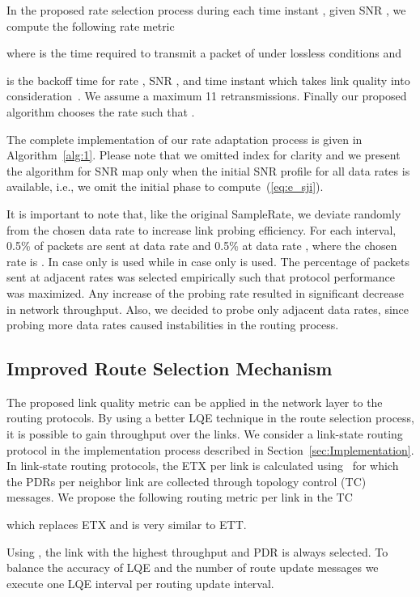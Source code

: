 \documentclass[11pt,draftclsnofoot,journal,onecolumn]{IEEEtran}
\begin{document}
In the proposed rate selection process during each time instant , given SNR , we compute the following rate metric

where  is the time required to transmit a packet of  under lossless conditions and

is the backoff time for rate , SNR , and time instant  which takes link quality into consideration~\cite[Eq. 17]{Draves_MobiCom_2004}. We assume a maximum 11 retransmissions. Finally our proposed algorithm chooses the rate such that .


The complete implementation of our rate adaptation process is given in Algorithm~\ref{alg:1}. Please note that we omitted index  for clarity and we present the algorithm for SNR map only when the initial SNR profile for all data rates is available, i.e., we omit the initial phase to compute~(\ref{eq:e_sji}).

It is important to note that, like the original SampleRate, we deviate randomly from the chosen data rate to increase link probing efficiency. For each interval, 0.5\% of packets are sent at data rate  and 0.5\% at data rate , where the chosen rate is . In case  only  is used while in case  only  is used. The percentage of packets sent at adjacent rates was selected empirically such that protocol performance was maximized. Any increase of the probing rate resulted in significant decrease in network throughput. Also, we decided to probe only adjacent data rates, since probing more data rates caused instabilities in the routing process.

\subsection{Improved Route Selection Mechanism}
\label{sec:SNR_ROUTE}

The proposed link quality metric can be applied in the network layer to the routing protocols. By using a better LQE technique in the route selection process, it is possible to gain throughput over the links. We consider a link-state routing protocol in the implementation process described in Section~\ref{sec:Implementation}. In link-state routing protocols, the ETX per link is calculated using~\cite[Eq. 1]{Couto_WN_2005} for which the PDRs per neighbor link are collected through topology control (TC) messages. We propose the following routing metric per link in the TC

which replaces ETX and is very similar to ETT.

Using , the link with the highest throughput and PDR is always selected. To balance the accuracy of LQE and the number of route update messages we execute one LQE interval per routing update interval.
\end{document}
